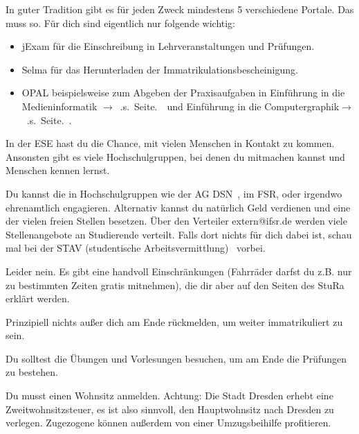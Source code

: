 In guter Tradition gibt es für jeden Zweck mindestens 5 verschiedene Portale. Das muss so. Für dich sind eigentlich nur folgende wichtig:
\begin{itemize}
\item jExam für die Einschreibung in Lehrveranstaltungen und Prüfungen.
\item Selma für das Herunterladen der Immatrikulationsbescheinigung.
\item OPAL beispielsweise zum Abgeben der Praxisaufgaben in Einführung in die Medieninformatik $\rightarrow$~.s.~Seite.~\pageref{lec:emi}~und Einführung in die Computergraphik$\rightarrow$~.s.~Seite.~\pageref{lec:ecg}.
\end{itemize}

In der ESE hast du die Chance, mit vielen Menschen in Kontakt zu kommen. Ansonsten gibt es viele Hochschulgruppen, bei denen du mitmachen kannst und Menschen kennen lernst.

Du kannst die in Hochschulgruppen wie der AG DSN~, im FSR, oder irgendwo ehrenamtlich engagieren. Alternativ kannst du natürlich Geld verdienen und eine der vielen freien Stellen besetzen. Über den Verteiler extern@ifsr.de werden viele Stellenangebote an Studierende verteilt. Falls dort nichts für dich dabei ist, schau mal bei der STAV (studentische Arbeitsvermittlung)~ vorbei.

Leider nein. Es gibt eine handvoll Einschränkungen (Fahrräder darfst du z.B. nur zu bestimmten Zeiten gratis mitnehmen), die dir aber auf den Seiten des StuRa~ erklärt werden.

Prinzipiell nichts außer dich am Ende rückmelden, um weiter immatrikuliert zu sein.

Du solltest die Übungen und Vorlesungen besuchen, um am Ende die Prüfungen zu bestehen.

Du musst einen Wohnsitz anmelden. Achtung: Die Stadt Dresden erhebt eine Zweitwohnsitzsteuer, es ist also sinnvoll, den Hauptwohnsitz nach Dresden zu verlegen. Zugezogene können außerdem von einer Umzugsbeihilfe profitieren.

